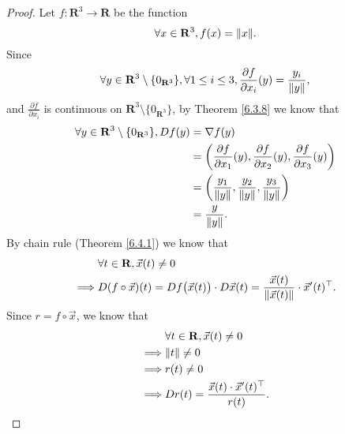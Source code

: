 \begin{proof}
    Let \(f : \mathbf{R}^3 \to \mathbf{R}\) be the function
    \[
        \forall x \in \mathbf{R}^3, f(x) = \norm*{x}.
    \]
    Since
    \[
        \forall y \in \mathbf{R}^3 \setminus \{0_{\mathbf{R}^3}\}, \forall 1 \leq i \leq 3, \frac{\partial f}{\partial x_i}(y) = \frac{y_i}{\norm*{y}},
    \]
    and \(\frac{\partial f}{\partial x_i}\) is continuous on \(\mathbf{R}^3 \setminus \{0_{\mathbf{R}^3}\}\), by Theorem \ref{6.3.8} we know that
    \begin{align*}
        \forall y \in \mathbf{R}^3 \setminus \{0_{\mathbf{R}^3}\}, D f(y) & = \nabla f(y)                                                                                                            \\
                                                                          & = \bigg(\frac{\partial f}{\partial x_1}(y), \frac{\partial f}{\partial x_2}(y), \frac{\partial f}{\partial x_3}(y)\bigg) \\
                                                                          & = \bigg(\frac{y_1}{\norm*{y}}, \frac{y_2}{\norm*{y}}, \frac{y_3}{\norm*{y}}\bigg)                                        \\
                                                                          & = \frac{y}{\norm*{y}}.
    \end{align*}
    By chain rule (Theorem \ref{6.4.1}) we know that
    \begin{align*}
                 & \forall t \in \mathbf{R}, \vec{x}(t) \neq 0                                                                                         \\
        \implies & D (f \circ \vec{x})(t) = D f\big(\vec{x}(t)\big) \cdot D \vec{x}(t) = \frac{\vec{x}(t)}{\norm*{\vec{x}(t)}} \cdot \vec{x}'(t)^\top.
    \end{align*}
    Since \(r = f \circ \vec{x}\), we know that
    \begin{align*}
                 & \forall t \in \mathbf{R}, \vec{x}(t) \neq 0              \\
        \implies & \norm*{t} \neq 0                                         \\
        \implies & r(t) \neq 0                                              \\
        \implies & D r(t) = \frac{\vec{x}(t) \cdot \vec{x}'(t)^\top}{r(t)}.
    \end{align*}
\end{proof}